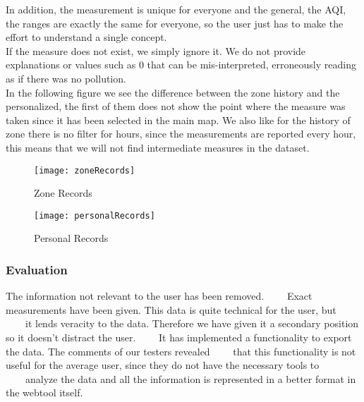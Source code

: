 In addition, the measurement is unique for everyone and the general, the AQI, the ranges are exactly the same for everyone, so the user just has to make the effort to understand a single concept.\\

If the measure does not exist, we simply ignore it. We do not provide explanations or values such as 0 that can be mis-interpreted, erroneously reading as if there was no pollution.\\


In the following figure we see the difference between the zone history and the personalized, the first of them does not show
the point where the measure was taken since it has been selected in the main map. We also like for the history of
zone there is no filter for hours, since the measurements are reported every hour, this means that we will not find
intermediate measures in the dataset.\\

\newpage
\begin{figure}[ht]
    \centering
    \texttt{[image: zoneRecords]}
    \caption{Zone Records}
\end{figure}
\begin{figure}[ht]
    \centering
    \texttt{[image: personalRecords]}
    \caption{Personal Records}
\end{figure}

\subsubsection*{Evaluation}  

\begin{itemize}
    \done The information not relevant to the user has been removed.
    \crossed Exact measurements have been given. This data is quite technical for the user, but 
    it lends veracity to the data. Therefore we have given it a secondary position so it doesn't distract the user.
    \crossed It has implemented a functionality to export the data. The comments of our testers revealed
    that this functionality is not useful for the average user, since they do not have the necessary tools to
    analyze the data and all the information is represented in a better format in the webtool itself.
\end{itemize}